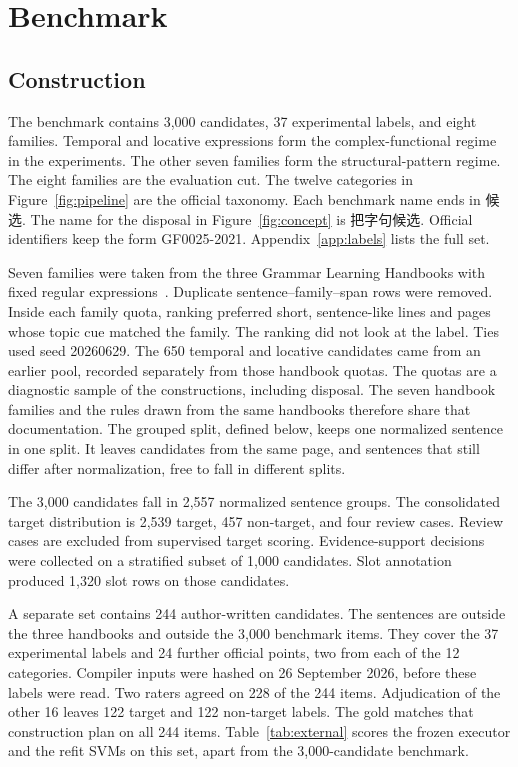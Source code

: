 \documentclass[pdflatex,sn-mathphys,NameDate]{sn-jnl}
\begin{document}
\section{Benchmark}
\label{sec:benchmark}

\subsection{Construction}

The benchmark contains 3,000 candidates, 37 experimental labels, and eight families.
Temporal and locative expressions form the complex-functional regime in the experiments.
The other seven families form the structural-pattern regime.
The eight families are the evaluation cut.
The twelve categories in Figure~\ref{fig:pipeline} are the official taxonomy.
Each benchmark name ends in 候选.
The name for the disposal in Figure~\ref{fig:concept} is \mbox{把字句候选}.
Official identifiers keep the form GF0025-2021.
Appendix~\ref{app:labels} lists the full set.

Seven families were taken from the three Grammar Learning Handbooks with fixed regular expressions~\citep{cti2022handbooks}.
Duplicate sentence--family--span rows were removed.
Inside each family quota, ranking preferred short, sentence-like lines and pages whose topic cue matched the family.
The ranking did not look at the label.
Ties used seed 20260629.
The 650 temporal and locative candidates came from an earlier pool, recorded separately from those handbook quotas.
The quotas are a diagnostic sample of the constructions, including disposal.
The seven handbook families and the rules drawn from the same handbooks therefore share that documentation.
The grouped split, defined below, keeps one normalized sentence in one split.
It leaves candidates from the same page, and sentences that still differ after normalization, free to fall in different splits.

The 3,000 candidates fall in 2,557 normalized sentence groups.
The consolidated target distribution is 2,539 target, 457 non-target, and four review cases.
Review cases are excluded from supervised target scoring.
Evidence-support decisions were collected on a stratified subset of 1,000 candidates.
Slot annotation produced 1,320 slot rows on those candidates.

A separate set contains 244 author-written candidates.
The sentences are outside the three handbooks and outside the 3,000 benchmark items.
They cover the 37 experimental labels and 24 further official points, two from each of the 12 categories.
Compiler inputs were hashed on 26 September 2026, before these labels were read.
Two raters agreed on 228 of the 244 items.
Adjudication of the other 16 leaves 122 target and 122 non-target labels.
The gold matches that construction plan on all 244 items.
Table~\ref{tab:external} scores the frozen executor and the refit SVMs on this set, apart from the 3,000-candidate benchmark.
\end{document}
